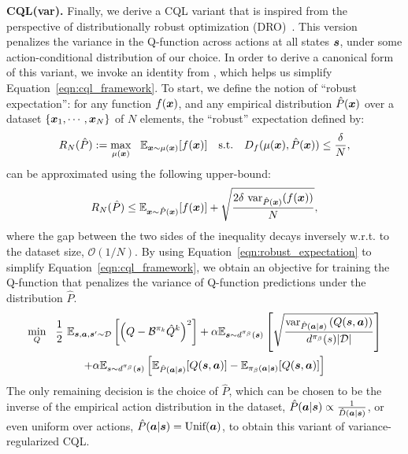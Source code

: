 \textbf{CQL(var).} Finally, we derive a CQL variant that is inspired from the perspective of distributionally robust optimization (DRO)~\citep{namkoong2017variance}. This version penalizes the variance in the Q-function across actions at all states $\boldsymbol{s}$, under some action-conditional distribution of our choice. In order to derive a canonical form of this variant, we invoke an identity from \citet{namkoong2017variance}, which helps us simplify Equation~\ref{eqn:cql_framework}. To start, we define the notion of ``robust expectation'': for any function $f(\boldsymbol{x})$, and any empirical distribution $\hat{P}(\boldsymbol{x})$ over a dataset $\{ \boldsymbol{x}_1, \cdots, \boldsymbol{x}_N\}$ of $N$ elements, the ``robust'' expectation defined by: 
\begin{equation*}
    R_N(\hat{P}) := \max_{\mu(\boldsymbol{x})} ~~\mathbb{E}_{\boldsymbol{x} \sim \mu(\boldsymbol{x})}[f(\boldsymbol{x})] \text{~~~s.t.~~~} D_{f}(\mu(\boldsymbol{x}), \hat{P}(\boldsymbol{x})) \leq \frac{\delta}{N},
\end{equation*}    
can be approximated using the following upper-bound:
\begin{equation}
    R_N(\hat{P}) \leq \mathbb{E}_{\boldsymbol{x} \sim \hat{P}(\boldsymbol{x})}[f(\boldsymbol{x})] + \sqrt{\frac{2 \delta~ \text{var}_{\hat{P}(\boldsymbol{x})}(f(\boldsymbol{x}))}{N}},
    \label{eqn:robust_expectation}
\end{equation}
where the gap between the two sides of the inequality decays inversely w.r.t. to the dataset size, $\mathcal{O}(1/N)$. By using Equation~\ref{eqn:robust_expectation} to simplify Equation~\ref{eqn:cql_framework}, we obtain an objective for training the Q-function that penalizes the variance of Q-function predictions under the distribution $\hat{P}$. 
\begin{multline}
    \min_{Q}~~ \frac{1}{2}~ \mathbb{E}_{\boldsymbol{s}, \boldsymbol{a}, \boldsymbol{s}' \sim \mathcal{D}}\left[\left(Q - \mathcal{B}^{\pi_k} \hat{Q}^{k} \right)^2 \right] + \alpha \mathbb{E}_{\boldsymbol{s} \sim d^{\pi_\beta}(\boldsymbol{s})}\left[\sqrt{\frac{\text{var}_{\hat{P}(\boldsymbol{a}|\boldsymbol{s})}\left( Q(\boldsymbol{s}, \boldsymbol{a}) \right)}{d^{\pi_\beta}(s) |\mathcal{D}|}} \right] \\ 
    + \alpha \mathbb{E}_{s \sim d^{\pi_\beta}(\boldsymbol{s})}\left[ \mathbb{E}_{\hat{P}(\boldsymbol{a}|\boldsymbol{s})}[Q(\boldsymbol{s}, \boldsymbol{a})] - \mathbb{E}_{{\pi_\beta}(\boldsymbol{a}|\boldsymbol{s})}[Q(\boldsymbol{s}, \boldsymbol{a})] \right]
    \label{eqn:variance_regularized_again}
\end{multline}
The only remaining decision is the choice of $\hat{P}$, which can be chosen to be the inverse of the empirical action distribution in the dataset, $\hat{P}(\boldsymbol{a}|\boldsymbol{s}) \propto \frac{1}{\hat{D}(\boldsymbol{a}|\boldsymbol{s})}$, or even uniform over actions, $\hat{P}(\boldsymbol{a}|\boldsymbol{s}) = \text{Unif}(\boldsymbol{a})$, to obtain this variant of variance-regularized CQL.

